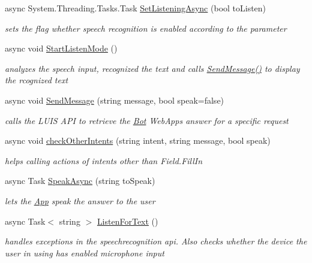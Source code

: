 \begin{DoxyCompactItemize}
async System.\+Threading.\+Tasks.\+Task \hyperlink{class_listen_to_me_1_1_main_page_a57d75ef6bb9c10b0c944c3eb5513b076}{Set\+Listening\+Async} (bool to\+Listen)
\begin{DoxyCompactList}\small\item\em sets the flag whether speech recognition is enabled according to the parameter \end{DoxyCompactList}\item 
async void \hyperlink{class_listen_to_me_1_1_main_page_ab9fba04f0fc94773c2838f6af87ec14b}{Start\+Listen\+Mode} ()
\begin{DoxyCompactList}\small\item\em analyzes the speech input, recognized the text and calls \hyperlink{class_listen_to_me_1_1_main_page_a09c2518852d4261ff6a2118c8e01de9f}{Send\+Message()} to display the rcognized text \end{DoxyCompactList}\item 
async void \hyperlink{class_listen_to_me_1_1_main_page_a09c2518852d4261ff6a2118c8e01de9f}{Send\+Message} (string message, bool speak=false)
\begin{DoxyCompactList}\small\item\em calls the L\+U\+IS A\+PI to retrieve the \hyperlink{class_listen_to_me_1_1_bot}{Bot} Web\+App\textquotesingle{}s answer for a specific request \end{DoxyCompactList}\item 
async void \hyperlink{class_listen_to_me_1_1_main_page_a203cee0f97f99d3ac38d9338e7c39427}{check\+Other\+Intents} (string intent, string message, bool speak)
\begin{DoxyCompactList}\small\item\em helps calling actions of intents other than Field.\+Fill\+In \end{DoxyCompactList}\item 
async Task \hyperlink{class_listen_to_me_1_1_main_page_aa1c50f04230b8907027a95bfe54cb7d2}{Speak\+Async} (string to\+Speak)
\begin{DoxyCompactList}\small\item\em lets the \hyperlink{class_listen_to_me_1_1_app}{App} speak the answer to the user \end{DoxyCompactList}\item 
async Task$<$ string $>$ \hyperlink{class_listen_to_me_1_1_main_page_a94a7dfd5dc1ec2e9bf7a86a4b9f7df0c}{Listen\+For\+Text} ()
\begin{DoxyCompactList}\small\item\em handles exceptions in the speechrecognition api. Also checks whether the device the user in using has enabled microphone input \end{DoxyCompactList}\item 

\end{DoxyCompactItemize}
